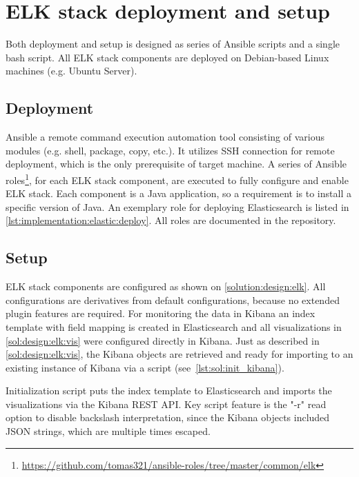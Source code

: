 \documentclass[12pt,a4paper,twoside]{report}
\begin{document}
	\section{ELK stack deployment and setup} \label{implementation:elk}
		Both deployment and setup is designed as series of Ansible scripts and a single bash script. All ELK stack components are deployed on Debian-based Linux machines (e.g. Ubuntu Server).
		\subsection{Deployment} \label{implementation:elk:deploy}
			Ansible a remote command execution automation tool consisting of various modules (e.g. shell, package, copy, etc.). It utilizes SSH connection for remote deployment, which is the only prerequisite of target machine. A series of Ansible roles\footnote{\url{https://github.com/tomas321/ansible-roles/tree/master/common/elk}}, for each ELK stack component, are executed to fully configure and enable ELK stack. Each component is a Java application, so a requirement is to install a specific version of Java. An exemplary role for deploying Elasticsearch is listed in \autoref{lst:implementation:elastic:deploy}. All roles are documented in the repository.
			
		\subsection{Setup} \label{implementation:elk:setup}
			ELK stack components are configured as shown on \autoref{solution:design:elk}. All configurations are derivatives from default configurations, because no extended plugin features are required. For monitoring the data in Kibana an index template with field mapping is created in Elasticsearch and all visualizations in \autoref{sol:design:elk:vis} were configured directly in Kibana. Just as described in \autoref{sol:design:elk:vis}, the Kibana objects are retrieved and ready for importing to an existing instance of Kibana via a script (see~\autoref{lst:sol:init_kibana}).
			
			Initialization script puts the index template to Elasticsearch and imports the visualizations via the Kibana REST API. Key script feature is the "-r" read  option to disable backslash interpretation, since the Kibana objects included JSON strings, which are multiple times escaped.
\end{document}
